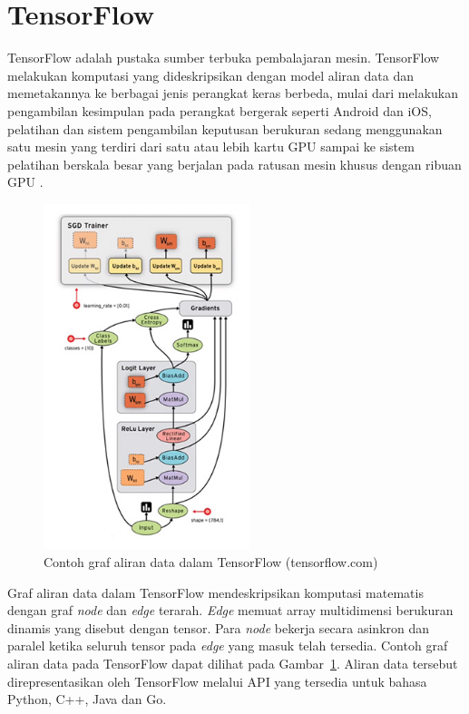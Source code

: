 \section{TensorFlow}
TensorFlow adalah pustaka sumber terbuka pembalajaran mesin. TensorFlow melakukan komputasi yang dideskripsikan dengan model aliran data dan memetakannya ke berbagai jenis perangkat keras berbeda, mulai dari melakukan pengambilan kesimpulan pada perangkat bergerak seperti Android dan iOS, pelatihan dan sistem pengambilan keputusan berukuran sedang menggunakan satu mesin yang terdiri dari satu atau lebih kartu GPU sampai ke sistem pelatihan berskala besar yang berjalan pada ratusan mesin khusus dengan ribuan GPU \citep{abadi-2015}.

\begin{figure}[h]
    \centering
    \includegraphics[width=6cm]{gambar/landasan-teori/tensorflow.jpg}
    \caption{Contoh graf aliran data dalam TensorFlow (tensorflow.com)}
    \label{gambar:tensorflow}
\end{figure}

Graf aliran data dalam TensorFlow mendeskripsikan komputasi matematis dengan graf \textit{node} dan \textit{edge} terarah. \textit{Edge} memuat array multidimensi berukuran dinamis yang disebut dengan tensor. Para \textit{node} bekerja secara asinkron dan paralel ketika seluruh tensor pada \textit{edge} yang masuk telah tersedia. Contoh graf aliran data pada TensorFlow dapat dilihat pada Gambar~\ref{gambar:tensorflow}. Aliran data tersebut direpresentasikan oleh TensorFlow melalui API yang tersedia untuk bahasa Python, C++, Java dan Go.


